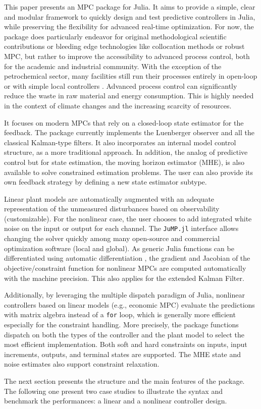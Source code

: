 This paper presents an MPC package for Julia. It aims to provide a simple, clear and modular framework to quickly design and test predictive controllers in Julia, while preserving the flexibility for advanced real-time optimization. For now, the package does particularly endeavor for original methodological scientific contributions or bleeding edge technologies like collocation methods or robust MPC, but rather to improve the accessibility to advanced process control, both for the academic and industrial community. With the exception of the petrochemical sector, many facilities still run their processes entirely in open-loop or with simple local controllers \citep{gapMPC}. Advanced process control can significantly reduce the waste in raw material and energy consumption. This is highly needed in the context of climate changes and the increasing scarcity of resources.

It focuses on modern MPCs that rely on a closed-loop state estimator for the feedback. The package currently implements the Luenberger observer and all the classical Kalman-type filters. It also incorporates an internal model control structure, as a more traditional approach. In addition, the analog of predictive control but for state estimation, the moving horizon estimator (MHE), is also available to solve constrained estimation problems. The user can also provide its own feedback strategy by defining a new state estimator subtype.

Linear plant models are automatically augmented with an adequate representation of the unmeasured disturbances based on observability (customizable). For the nonlinear case, the user chooses to add integrated white noise on the input or output for each channel. The \texttt{JuMP.jl} interface allows changing the solver quickly among  many open-source and commercial optimization software (local and global). As generic Julia functions can be differentiated using automatic differentiation , the gradient and Jacobian of the objective/constraint function for nonlinear MPCs are computed automatically with the machine precision. This also applies for the extended Kalman Filter. 

Additionally, by leveraging the multiple dispatch paradigm of Julia, nonlinear controllers based on linear models (e.g., economic MPC) evaluate the predictions with matrix algebra instead of a \texttt{for} loop, which is generally more efficient especially for the constraint handling. More precisely, the package functions dispatch on both the types of the controller and the plant model to select the most efficient implementation. Both soft and hard constraints on inputs, input increments, outputs, and terminal states are supported. The MHE state and noise estimates also support constraint relaxation.

The next section presents the structure and the main features of the package. The following one present two case studies to illustrate the syntax and benchmark the performances: a linear and a nonlinear controller design.